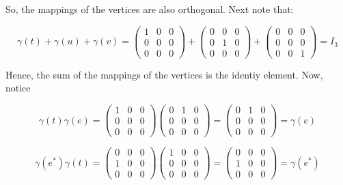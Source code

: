\begin{solution}
    So, the mappings of the vertices are also orthogonal. Next note that:

    $$\gamma(t)+\gamma(u)+\gamma(v)=
    \left(\begin{array}{ccc} 1 & 0 & 0 \\ 0 & 0 & 0 \\ 0 & 0 & 0 \end{array}\right)
    +\left(\begin{array}{ccc} 0 & 0 & 0 \\ 0 & 1 & 0 \\ 0 & 0 & 0 \end{array}\right)
    +\left(\begin{array}{ccc} 0 & 0 & 0 \\ 0 & 0 & 0 \\ 0 & 0 & 1 \end{array}\right)=I_3$$

    Hence, the sum of the mappings of the vertices is the identiy element. Now, notice

    $$\gamma(t)\gamma(e)=\left(\begin{array}{ccc} 1 & 0 & 0 \\ 0 & 0 & 0 \\ 0 & 0 & 0 \end{array}\right)
    \left(\begin{array}{ccc} 0 & 1 & 0 \\ 0 & 0 & 0 \\ 0 & 0 & 0 \end{array}\right)
    =\left(\begin{array}{ccc} 0 & 1 & 0 \\ 0 & 0 & 0 \\ 0 & 0 & 0 \end{array}\right)=\gamma(e)$$

    $$\gamma(e^*)\gamma(t)=
    \left(\begin{array}{ccc} 0 & 0 & 0 \\ 1 & 0 & 0 \\ 0 & 0 & 0 \end{array}\right)
    \left(\begin{array}{ccc} 1 & 0 & 0 \\ 0 & 0 & 0 \\ 0 & 0 & 0 \end{array}\right)
    =\left(\begin{array}{ccc} 0 & 0 & 0 \\ 1 & 0 & 0 \\ 0 & 0 & 0 \end{array}\right)=\gamma(e^*)$$


\end{solution}
